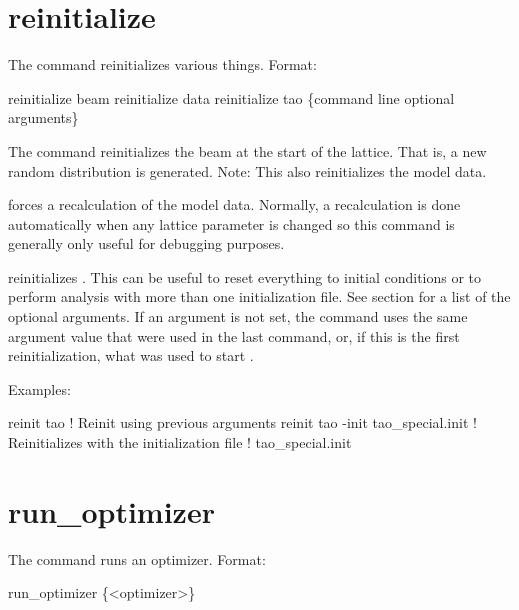 \section{reinitialize}
\label{s:reinit}

The  command reinitializes various things. Format:
\begin{example}
  reinitialize beam
  reinitialize data
  reinitialize tao \{command line optional arguments\}
\end{example}

\vskip 0.2in 

The  command reinitializes the beam at the start
of the lattice. That is, a new random distribution is generated. 
Note: This also reinitializes the model data.

 forces a recalculation of the model data.
Normally, a recalculation is done automatically when any lattice
parameter is changed so this command is generally only useful for
debugging purposes.

 reinitializes \tao. This can be useful to reset
everything to initial conditions or to perform analysis with more than
one initialization file. See section  for
a list of the optional arguments.  If an argument is not set, the
 command uses the same argument value that were used in
the last  command, or, if this is the first
reinitialization, what was used to start \tao. 

Examples:
\begin{example}
  reinit tao                         ! Reinit using previous arguments
  reinit tao -init tao_special.init  ! Reinitializes \tao with the initialization file 
                                     !   tao_special.init
\end{example}


\section{run_optimizer}
\label{s:run}

The  command runs an optimizer. Format:
\begin{example}
  run_optimizer \{<optimizer>\}
\end{example}

